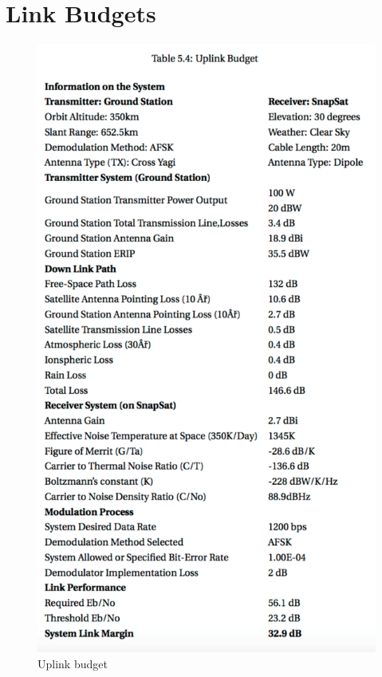 \documentclass[a4paper,12pt]{article}
\begin{document}
\section{Link Budgets}
\begin{figure}[H]
    \centering
    \includegraphics[width=\linewidth]{./figures/fulluplink}
    \caption{Uplink budget}
\end{figure}
\end{document}
